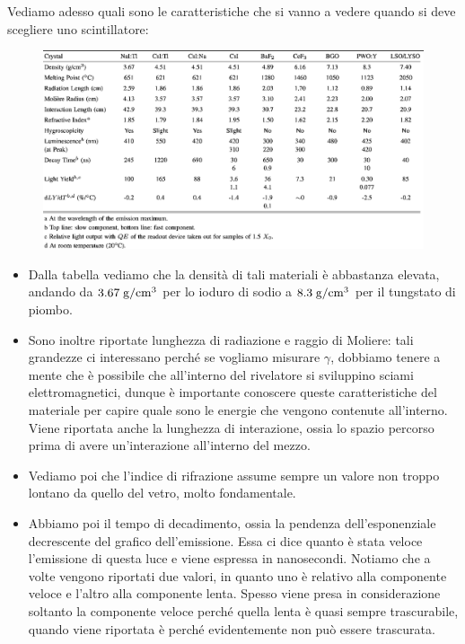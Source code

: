\begin{esempio}
   Vediamo adesso quali sono le caratteristiche che si vanno a vedere quando si deve scegliere uno scintillatore:
   \begin{figure}[H]
      \centering
      \includegraphics[width=\textwidth]{immagini/caratteristiche_scintillatori_inorganici.png}
   \end{figure}
   \begin{itemize}[leftmargin=0.5cm]
      \item Dalla tabella vediamo che la densità di tali materiali è abbastanza elevata, andando da $\rm 3.67 \; g/cm^3$ per lo ioduro di sodio a $\rm 8.3 \; g/cm^3$ per il tungstato di piombo.
      \item Sono inoltre riportate lunghezza di radiazione e raggio di Moliere: tali grandezze ci interessano perché se vogliamo misurare $\gamma$, dobbiamo tenere a mente che è possibile che all'interno del rivelatore si sviluppino sciami elettromagnetici, dunque è importante conoscere queste caratteristiche del materiale per capire quale sono le energie che vengono contenute all'interno. Viene riportata anche la lunghezza di interazione, ossia lo spazio percorso prima di avere un'interazione all'interno del mezzo.
      \item Vediamo poi che l'indice di rifrazione assume sempre un valore non troppo lontano da quello del vetro, molto fondamentale.
      \item Abbiamo poi il tempo di decadimento, ossia la pendenza dell'esponenziale decrescente del grafico dell'emissione. Essa ci dice quanto è stata veloce l'emissione di questa luce e viene espressa in nanosecondi. Notiamo che a volte vengono riportati due valori, in quanto uno è relativo alla componente veloce e l'altro alla componente lenta. Spesso viene presa in considerazione soltanto la componente veloce perché quella lenta è quasi sempre trascurabile, quando viene riportata è perché evidentemente non può essere trascurata. 

\end{itemize}
\end{esempio}
